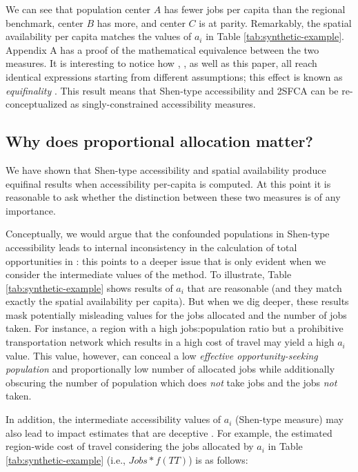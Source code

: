 \documentclass[]{elsarticle} %
\begin{document}
We can see that population center \(A\) has fewer jobs per capita than
the regional benchmark, center \(B\) has more, and center \(C\) is at
parity. Remarkably, the spatial availability per capita matches the
values of \(a_i\) in Table \ref{tab:synthetic-example}. Appendix A has a
proof of the mathematical equivalence between the two measures. It is
interesting to notice how \citet{weibull_axiomatic_1976},
\citet{shen1998}, as well as this paper, all reach identical expressions
starting from different assumptions; this effect is known as
\emph{equifinality}
\citetext{\citealp[see][p.~333]{ortuzar_2011_modelling}; \citealp[and][]{williams_hall_1981}}.
This result means that Shen-type accessibility and 2SFCA can be
re-conceptualized as singly-constrained accessibility measures.

\hypertarget{why-does-proportional-allocation-matter}{%
\subsection{Why does proportional allocation
matter?}\label{why-does-proportional-allocation-matter}}

We have shown that Shen-type accessibility and spatial availability
produce equifinal results when accessibility per-capita is computed. At
this point it is reasonable to ask whether the distinction between these
two measures is of any importance.

Conceptually, we would argue that the confounded populations in
Shen-type accessibility leads to internal inconsistency in the
calculation of total opportunities in \citet{shen1998}: this points to a
deeper issue that is only evident when we consider the intermediate
values of the method. To illustrate, Table \ref{tab:synthetic-example}
shows results of \(a_i\) that are reasonable (and they match exactly the
spatial availability per capita). But when we dig deeper, these results
mask potentially misleading values for the jobs allocated and the number
of jobs taken. For instance, a region with a high jobs:population ratio
but a prohibitive transportation network which results in a high cost of
travel may yield a high \(a_i\) value. This value, however, can conceal
a low \emph{effective opportunity-seeking population} and proportionally
low number of allocated jobs while additionally obscuring the number of
population which does \emph{not} take jobs and the jobs \emph{not}
taken.

In addition, the intermediate accessibility values of \(a_i\) (Shen-type
measure) may also lead to impact estimates that are deceptive
\citep[see][]{sarlas_2020_betweenness}. For example, the estimated
region-wide cost of travel considering the jobs allocated by \(a_i\) in
Table \ref{tab:synthetic-example} (i.e., \(Jobs*f(TT)\)) is as follows:
\end{document}
